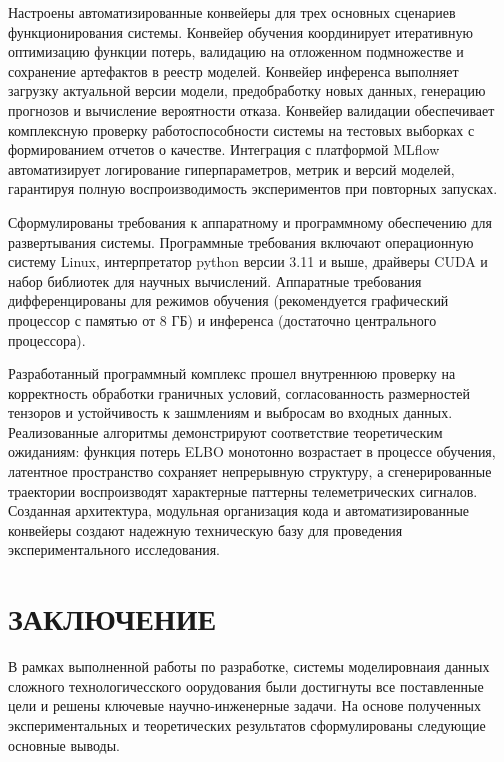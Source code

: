 \documentclass[14pt, a4paper, oneside]{extreport}
\begin{document}
Настроены автоматизированные конвейеры для трех основных сценариев функционирования системы. Конвейер обучения координирует итеративную оптимизацию функции потерь, валидацию на отложенном подмножестве и сохранение артефактов в реестр моделей. Конвейер инференса выполняет загрузку актуальной версии модели, предобработку новых данных, генерацию прогнозов и вычисление вероятности отказа. Конвейер валидации обеспечивает комплексную проверку работоспособности системы на тестовых выборках с формированием отчетов о качестве. Интеграция с платформой MLflow автоматизирует логирование гиперпараметров, метрик и версий моделей, гарантируя полную воспроизводимость экспериментов при повторных запусках.

Сформулированы требования к аппаратному и программному обеспечению для развертывания системы. Программные требования включают операционную систему Linux, интерпретатор python версии 3.11 и выше, драйверы CUDA и набор библиотек для научных вычислений. Аппаратные требования дифференцированы для режимов обучения (рекомендуется графический процессор с памятью от 8 ГБ) и инференса (достаточно центрального процессора).

Разработанный программный комплекс прошел внутреннюю проверку на корректность обработки граничных условий, согласованность размерностей тензоров и устойчивость к зашмлениям и выбросам во входных данных. Реализованные алгоритмы демонстрируют соответствие теоретическим ожиданиям: функция потерь ELBO монотонно возрастает в процессе обучения, латентное пространство сохраняет непрерывную структуру, а сгенерированные траектории воспроизводят характерные паттерны телеметрических сигналов. Созданная архитектура, модульная организация кода и автоматизированные конвейеры создают надежную техническую базу для проведения экспериментального исследования.

\clearpage

\section{ЗАКЛЮЧЕНИЕ}
\vspace{1em}
В рамках выполненной работы по разработке, системы моделировнаия данных сложного технологичесского оорудования были достигнуты все поставленные цели и решены ключевые научно-инженерные задачи. На основе полученных экспериментальных и теоретических результатов сформулированы следующие основные выводы.
\end{document}
